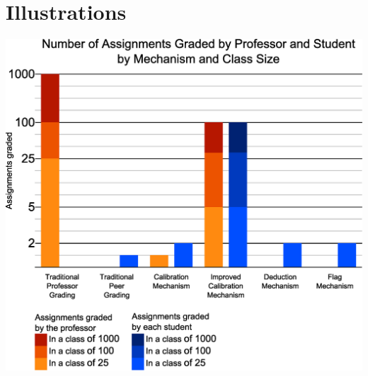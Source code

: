 \documentclass[12pt, Arial]{article}
\begin{document}
\section{Illustrations}
{
\noindent
\includegraphics[width=\textwidth]{Chart.eps}
}
\end{document}

